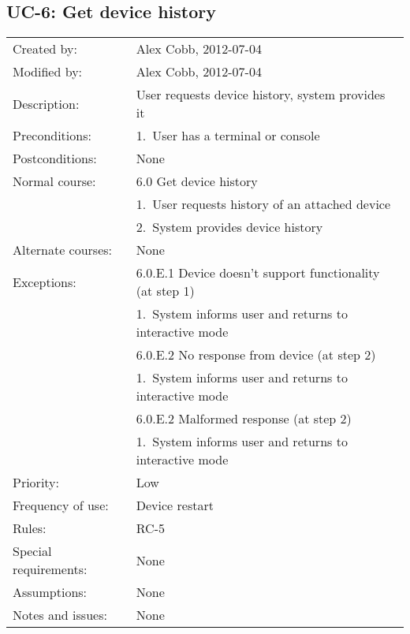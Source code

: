\documentclass[pdftex,oneside,12pt,a4paper]{book}
\begin{document}
\subsection{UC-6: Get device history}
\begin{tabular}{|l|p{10cm}|}\hline
Created by: & Alex Cobb, 2012-07-04 \\
Modified by: & Alex Cobb, 2012-07-04 \\\hline
Description: & User requests device history, system provides it \\\hline
Preconditions: & 1.\ User has a terminal or console \\\hline
Postconditions: & None \\\hline
Normal course: & 6.0 Get device history\\
 & 1.\ User requests history of an attached device \\
 & 2.\ System provides device history\\\hline
Alternate courses: & None \\\hline
Exceptions: & 6.0.E.1 Device doesn't support functionality (at step 1)\\
 & 1.\ System informs user and returns to interactive mode \\\cline{2-2}
 & 6.0.E.2 No response from device (at step 2) \\
 & 1.\ System informs user and returns to interactive mode \\\cline{2-2}
 & 6.0.E.2 Malformed response (at step 2)\\
 & 1.\ System informs user and returns to interactive mode\\\hline
Priority: & Low \\\hline
Frequency of use: & Device restart\\\hline
Rules: & RC-5\\\hline
Special requirements: & None\\\hline
Assumptions: & None\\\hline
Notes and issues: & None\\\hline
\end{tabular}
\end{document}
